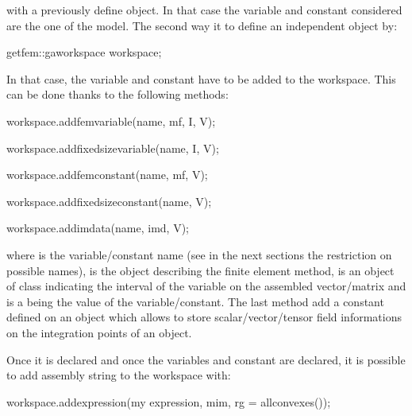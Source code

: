 \documentclass[a4paper,11pt,english]{sphinxmanual}
\begin{document}
with  a previously define  object. In that case the variable and constant considered are the one of the model. The second way it to define an independent  object by:

\begin{sphinxVerbatim}[commandchars=\\\{\}]
getfem::ga\PYGZus{}workspace workspace;
\end{sphinxVerbatim}

In that case, the variable and constant have to be added to the workspace. This can be done thanks to the following methods:

\begin{sphinxVerbatim}[commandchars=\\\{\}]
workspace.add\PYGZus{}fem\PYGZus{}variable(name, mf, I, V);

workspace.add\PYGZus{}fixed\PYGZus{}size\PYGZus{}variable(name, I, V);

workspace.add\PYGZus{}fem\PYGZus{}constant(name, mf, V);

workspace.add\PYGZus{}fixed\PYGZus{}size\PYGZus{}constant(name, V);

workspace.add\PYGZus{}im\PYGZus{}data(name, imd, V);
\end{sphinxVerbatim}

where  is the variable/constant name (see in the next sections the restriction on possible names),  is the  object describing the finite element method,  is an object of class  indicating the interval of the variable on the assembled vector/matrix and  is a  being the value of the variable/constant. The last method add a constant defined on an  object  which allows to store scalar/vector/tensor field informations on the integration points of an  object.

Once it is declared and once the variables and constant are declared, it is possible to add assembly string to the workspace with:

\begin{sphinxVerbatim}[commandchars=\\\{\}]
workspace.add\PYGZus{}expression(\PYGZdq{}my expression\PYGZdq{}, mim, rg = all\PYGZus{}convexes());
\end{sphinxVerbatim}
\end{document}
